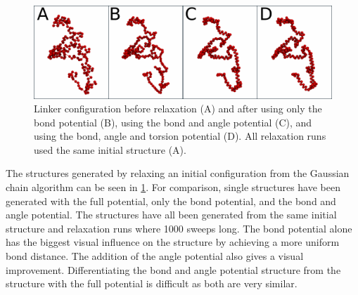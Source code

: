\documentclass[12pt, twoside]{report}
\begin{document}
\begin{figure}[!ht] \centering
\includegraphics[width=.9\textwidth]{figures/linker-relaxation-comparison}
\caption[Gaussian polymer chain before and after relaxation with a physical
model.]{Linker configuration before relaxation (A) and after using only the bond
potential (B), using the bond and angle potential (C), and using the bond, angle
and torsion potential (D). All relaxation runs used the same initial structure
(A).}
\label{fig:linker-relaxation-comparison}
\end{figure} The structures generated by relaxing an initial configuration from
the Gaussian chain algorithm can be seen in
\cref{fig:linker-relaxation-comparison}. For comparison, single structures have
been generated with the full potential, only the bond potential, and the bond
and angle potential. The structures have all been generated from the same
initial structure and relaxation runs where 1000 sweeps long. The bond potential
alone has the biggest visual influence on the structure by achieving a more
uniform bond distance. The addition of the angle potential also gives a visual
improvement. Differentiating the bond and angle potential structure from the
structure with the full potential is difficult as both are very similar.
\end{document}
